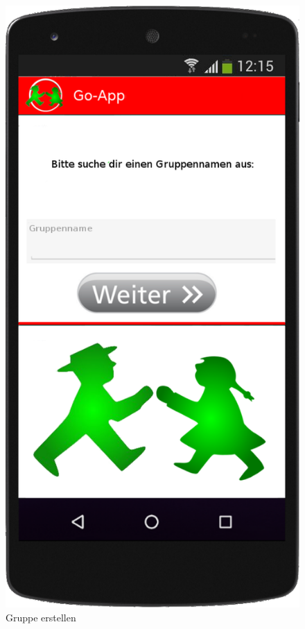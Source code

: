 
\begin{figure}
	\includegraphics[scale=0.2]{resources/images/handy/gruppe_erstellen.png}
	\caption{Gruppe erstellen}
\end{figure}

